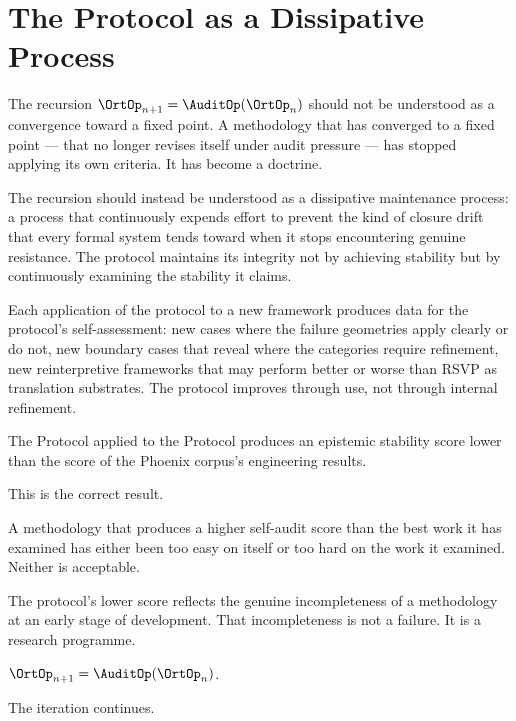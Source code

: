 \section{The Protocol as a Dissipative Process}
\label{sec:dissipative-process}

The recursion $\OrtOp_{n+1} = \AuditOp(\OrtOp_n)$
should not be understood as a convergence toward a
fixed point. A methodology that has converged to a
fixed point --- that no longer revises itself under
audit pressure --- has stopped applying its own
criteria. It has become a doctrine.

The recursion should instead be understood as a
dissipative maintenance process: a process that
continuously expends effort to prevent the kind of
closure drift that every formal system tends toward
when it stops encountering genuine resistance. The
protocol maintains its integrity not by achieving
stability but by continuously examining the stability
it claims.

Each application of the protocol to a new framework
produces data for the protocol's self-assessment:
new cases where the failure geometries apply clearly
or do not, new boundary cases that reveal where the
categories require refinement, new reinterpretive
frameworks that may perform better or worse than RSVP
as translation substrates. The protocol improves through
use, not through internal refinement.

\begin{interlude}
  The \Ortyx{} Protocol applied to the \Ortyx{} Protocol
  produces an epistemic stability score lower than the
  score of the Phoenix corpus's engineering results.

  This is the correct result.

  A methodology that produces a higher self-audit
  score than the best work it has examined has either
  been too easy on itself or too hard on the work
  it examined. Neither is acceptable.

  The protocol's lower score reflects the genuine
  incompleteness of a methodology at an early stage
  of development. That incompleteness is not a failure.
  It is a research programme.

  $\OrtOp_{n+1} = \AuditOp(\OrtOp_n)$.

  The iteration continues.
\end{interlude}
